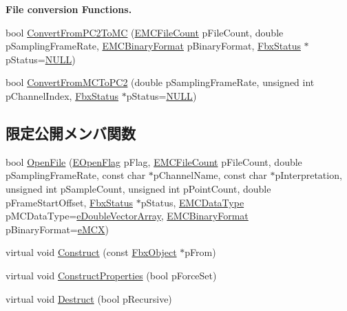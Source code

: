 \begin{Indent}\textbf{ File conversion Functions.}\par
\begin{DoxyCompactItemize}
\item 
bool \hyperlink{class_fbx_cache_a6ead5beab13a47d8ccfbc3730a6fb2fa}{Convert\+From\+P\+C2\+To\+MC} (\hyperlink{class_fbx_cache_afa5d133385fbd74b59e619c692a9cc36}{E\+M\+C\+File\+Count} p\+File\+Count, double p\+Sampling\+Frame\+Rate, \hyperlink{class_fbx_cache_af3afea849dd371f0b5ecbe135d34b829}{E\+M\+C\+Binary\+Format} p\+Binary\+Format, \hyperlink{class_fbx_status}{Fbx\+Status} $\ast$p\+Status=\hyperlink{fbxarch_8h_a070d2ce7b6bb7e5c05602aa8c308d0c4}{N\+U\+LL})
\item 
bool \hyperlink{class_fbx_cache_a2710bc7d786f60e90d54c192c02af938}{Convert\+From\+M\+C\+To\+P\+C2} (double p\+Sampling\+Frame\+Rate, unsigned int p\+Channel\+Index, \hyperlink{class_fbx_status}{Fbx\+Status} $\ast$p\+Status=\hyperlink{fbxarch_8h_a070d2ce7b6bb7e5c05602aa8c308d0c4}{N\+U\+LL})
\end{DoxyCompactItemize}
\end{Indent}
\subsection*{限定公開メンバ関数}
\begin{DoxyCompactItemize}
\item 
bool \hyperlink{class_fbx_cache_a224ab00ed0b4ead88a95a8c71f9c2575}{Open\+File} (\hyperlink{class_fbx_cache_a92f455159736ec2cdc0c282af9dbd139}{E\+Open\+Flag} p\+Flag, \hyperlink{class_fbx_cache_afa5d133385fbd74b59e619c692a9cc36}{E\+M\+C\+File\+Count} p\+File\+Count, double p\+Sampling\+Frame\+Rate, const char $\ast$p\+Channel\+Name, const char $\ast$p\+Interpretation, unsigned int p\+Sample\+Count, unsigned int p\+Point\+Count, double p\+Frame\+Start\+Offset, \hyperlink{class_fbx_status}{Fbx\+Status} $\ast$p\+Status, \hyperlink{class_fbx_cache_a80f82fa5f485ff6c46565ffb151998b3}{E\+M\+C\+Data\+Type} p\+M\+C\+Data\+Type=\hyperlink{class_fbx_cache_a80f82fa5f485ff6c46565ffb151998b3a650d3bda5d6886776bee42118f711cb3}{e\+Double\+Vector\+Array}, \hyperlink{class_fbx_cache_af3afea849dd371f0b5ecbe135d34b829}{E\+M\+C\+Binary\+Format} p\+Binary\+Format=\hyperlink{class_fbx_cache_af3afea849dd371f0b5ecbe135d34b829a9f9f7cbd770451b48ea473902dd04568}{e\+M\+CX})
\item 
virtual void \hyperlink{class_fbx_cache_a9d648bdc0a19f84e8d8fc7c4660c02ae}{Construct} (const \hyperlink{class_fbx_object}{Fbx\+Object} $\ast$p\+From)
\item 
virtual void \hyperlink{class_fbx_cache_af5858468e7fe97ab7731ade2bc99ff78}{Construct\+Properties} (bool p\+Force\+Set)
\item 
virtual void \hyperlink{class_fbx_cache_a0a020ee44ebdaf00433a492618f06ee4}{Destruct} (bool p\+Recursive)
\end{DoxyCompactItemize}
